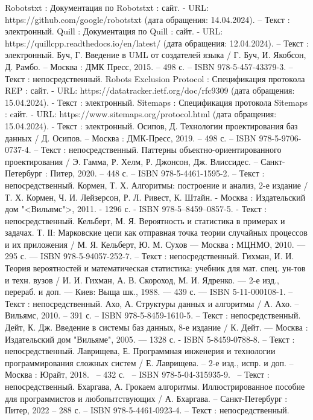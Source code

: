\begin{thebibliography}{51}
	 Robotstxt : Документация по Robotstxt : сайт. - URL: https://github.com/google/robotstxt (дата обращения: 14.04.2024). – Текст : электронный.
	 Quill : Документация по Quill : сайт. - URL: https://quillcpp.readthedocs.io/en/latest/ (дата обращения: 12.04.2024). – Текст : электронный.
	  Буч, Г. Введение в UML от создателей языка / Г. Буч, И. Якобсон, Д. Рамбо. – Москва : ДМК Пресс, 2015. – 498 с. – ISBN 978-5-457-43379-3. – Текст : непосредственный.
	 Robots Exclusion Protocol : Спецификация протокола REP : сайт. - URL: https://datatracker.ietf.org/doc/rfc9309 (дата обращения: 15.04.2024). - Текст : электронный.
	 Sitemaps : Спецификация протокола Sitemaps : cайт. - URL: https://www.sitemaps.org/protocol.html (дата обращения: 15.04.2024). - Текст : электронный.
	 Осипов, Д. Технологии проектирования баз данных / Д. Осипов. – Москва : ДМК-Пресс, 2019. – 498 с. – ISBN 978-5-9706-0737-4. – Текст : непосредственный.
	 Паттерны объектно-ориентированного проектирования / Э. Гамма, Р. Хелм, Р. Джонсон, Дж. Влиссидес. – Санкт-Петербург : Питер, 2020. – 448 с. – ISBN 978-5-4461-1595-2. – Текст : непосредственный.
	 Кормен, Т. Х. Алгоритмы: построение и анализ, 2-е издание / Т. Х. Кормен, Ч. И. Лейзерсон, Р. Л. Ривест, К. Штайн. - Москва : Издательский дом "<Вильямс">, 2011. - 1296 с. - ISBN 978-5–8459–0857-5. - Текст : непосредственный.
	 Кельберт, М. Я. Вероятность и статистика в примерах и задачах. Т. ІІ: Марковские цепи как отправная точка теории случайных процессов и их приложения / М. Я. Кельберт, Ю. М. Сухов  — Москва : МЦНМО, 2010. — 295 с. — ISBN 978-5-94057-252-7. – Текст : непосредственный.
	 Гихман, И. И. Теория вероятностей и математическая статистика: учебник для мат. спец. ун-тов и техн. вузов / И. И. Гихман, А. В. Скороход, М. И. Ядренко. — 2-е изд., перераб. и доп. — Киев: Выща шк., 1988. — 439 с. — ISBN 5-11-000108-1. – Текст : непосредственный.
	 Ахо, А. Структуры данных и алгоритмы / А. Ахо. – Вильямс, 2010. – 391 с. – ISBN 978-5-8459-1610-5. – Текст : непосредственный.
	 Дейт, К. Дж. Введение в системы баз данных, 8-е издание / К. Дейт. — Москва : Издательский дом "Вильяме", 2005. — 1328 с. - ISBN 5-8459-0788-8. – Текст : непосредственный.
	 Лаврищева, Е. Программная инженерия и технологии программирования сложных систем / Е. Лаврищева. – 2-е изд., испр. и доп. – Москва : Юрайт, 2018. ~– 432 с. ~– ISBN 978-5-04-315935-9. ~– Текст : непосредственный.
	 Бхаргава, А. Грокаем алгоритмы. Иллюстрированное пособие для программистов и любопытствующих / А. Бхаргава. – Санкт-Петербург : Питер, 2022 – 288 с. – ISBN 978-5-4461-0923-4. – Текст : непосредственный.

\end{thebibliography}

